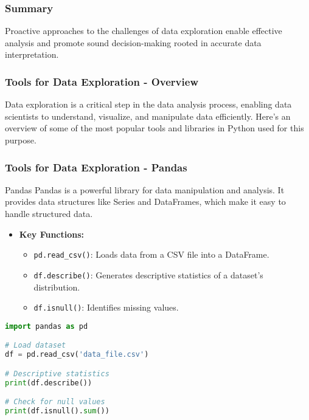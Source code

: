 \documentclass[aspectratio=169]{beamer}
\begin{document}
\begin{frame}
    \frametitle{Summary}
    Proactive approaches to the challenges of data exploration enable effective analysis and promote sound decision-making rooted in accurate data interpretation. 
\end{frame}

\begin{frame}[fragile]
  \frametitle{Tools for Data Exploration - Overview}
  Data exploration is a critical step in the data analysis process, enabling data scientists to understand, visualize, and manipulate data efficiently.  
  Here’s an overview of some of the most popular tools and libraries in Python used for this purpose.
\end{frame}

\begin{frame}[fragile]
  \frametitle{Tools for Data Exploration - Pandas}
  \begin{block}{Pandas}
    Pandas is a powerful library for data manipulation and analysis. It provides data structures like Series and DataFrames, which make it easy to handle structured data.
  \end{block}
  \begin{itemize}
    \item \textbf{Key Functions:}
    \begin{itemize}
      \item \texttt{pd.read\_csv()}: Loads data from a CSV file into a DataFrame.
      \item \texttt{df.describe()}: Generates descriptive statistics of a dataset’s distribution.
      \item \texttt{df.isnull()}: Identifies missing values.
    \end{itemize}
  \end{itemize}

  \begin{lstlisting}[language=Python]
import pandas as pd

# Load dataset
df = pd.read_csv('data_file.csv')

# Descriptive statistics
print(df.describe())

# Check for null values
print(df.isnull().sum())
  \end{lstlisting}
\end{frame}
\end{document}
